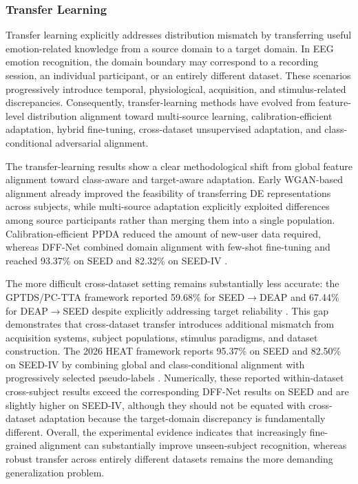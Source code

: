 \documentclass{WileyMSP-template}
\begin{document}
\subsubsection{Transfer Learning}
\label{subsubsec:transfer_learning_evaluation}

Transfer learning explicitly addresses distribution mismatch by transferring useful emotion-related knowledge from a source domain to a target domain. In EEG emotion recognition, the domain boundary may correspond to a recording session, an individual participant, or an entirely different dataset. These scenarios progressively introduce temporal, physiological, acquisition, and stimulus-related discrepancies. Consequently, transfer-learning methods have evolved from feature-level distribution alignment toward multi-source learning, calibration-efficient adaptation, hybrid fine-tuning, cross-dataset unsupervised adaptation, and class-conditional adversarial alignment.





The transfer-learning results show a clear methodological shift from global feature alignment toward class-aware and target-aware adaptation. Early WGAN-based alignment already improved the feasibility of transferring DE representations across subjects, while multi-source adaptation explicitly exploited differences among source participants rather than merging them into a single population. Calibration-efficient PPDA reduced the amount of new-user data required, whereas DFF-Net combined domain alignment with few-shot fine-tuning and reached 93.37\% on SEED and 82.32\% on SEED-IV \cite{lu2023frontiers_dffnet}.


The more difficult cross-dataset setting remains substantially less accurate: the GPTDS/PC-TTA framework reported 59.68\% for SEED$\rightarrow$DEAP and 67.44\% for DEAP$\rightarrow$SEED despite explicitly addressing target reliability \cite{imtiaz2025compbiomed_uda_gptds}. This gap demonstrates that cross-dataset transfer introduces additional mismatch from acquisition systems, subject populations, stimulus paradigms, and dataset construction. The 2026 HEAT framework reports 95.37\% on SEED and 82.50\% on SEED-IV by combining global and class-conditional alignment with progressively selected pseudo-labels \cite{hong2026heat}. Numerically, these reported within-dataset cross-subject results exceed the corresponding DFF-Net results on SEED and are slightly higher on SEED-IV, although they should not be equated with cross-dataset adaptation because the target-domain discrepancy is fundamentally different. Overall, the experimental evidence indicates that increasingly fine-grained alignment can substantially improve unseen-subject recognition, whereas robust transfer across entirely different datasets remains the more demanding generalization problem.
\end{document}
